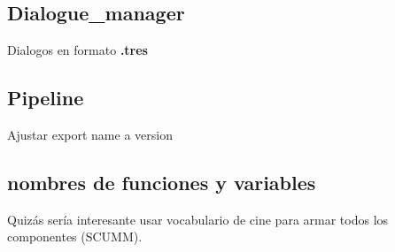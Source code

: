 \subsection{Dialogue\_manager}

Dialogos en formato \textbf{.tres}

\subsection{Pipeline}

Ajustar export name a version

\subsection{nombres de funciones y variables}

Quizás sería interesante usar vocabulario de cine para armar todos los componentes (SCUMM).
